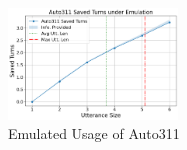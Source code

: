 


\begin{figure}[h]
    \centering
    \includegraphics[width=0.40\textwidth]{figures/emulation.png}
    \caption{Emulated Usage of Auto311}
    \label{fig:emulation}
    \vspace{-0.5cm}
\end{figure}






